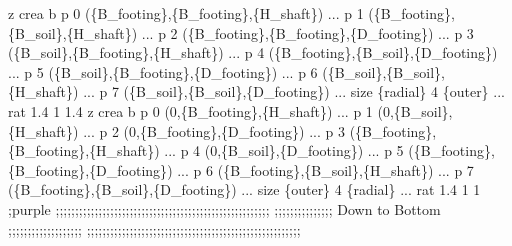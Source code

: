 \documentclass[a4paper, nobind]{templates/ociamthesis}
\newenvironment{Shaded}{\begin{snugshade}}{\end{snugshade}}
\newcommand{\SpecialCharTok}[1]{\textcolor[rgb]{0.00,0.00,0.00}{#1}}
\newcommand{\StringTok}[1]{\textcolor[rgb]{0.31,0.60,0.02}{#1}}
\renewenvironment{Shaded}
{
  \vspace{10pt}%
  \begin{snugshade}%
}{%
  \end{snugshade}%
  \vspace{8pt}%
}
\begin{document}
\begin{Shaded}
\begin{Highlighting}[]
\StringTok{z crea b p 0 (}\SpecialCharTok{\{B\_footing\}}\StringTok{,}\SpecialCharTok{\{B\_footing\}}\StringTok{,}\SpecialCharTok{\{H\_shaft\}}\StringTok{) ...}
\StringTok{         p 1 (}\SpecialCharTok{\{B\_footing\}}\StringTok{,}\SpecialCharTok{\{B\_soil\}}\StringTok{,}\SpecialCharTok{\{H\_shaft\}}\StringTok{) ...}
\StringTok{         p 2 (}\SpecialCharTok{\{B\_footing\}}\StringTok{,}\SpecialCharTok{\{B\_footing\}}\StringTok{,}\SpecialCharTok{\{D\_footing\}}\StringTok{) ...}
\StringTok{         p 3 (}\SpecialCharTok{\{B\_soil\}}\StringTok{,}\SpecialCharTok{\{B\_footing\}}\StringTok{,}\SpecialCharTok{\{H\_shaft\}}\StringTok{) ...}
\StringTok{         p 4 (}\SpecialCharTok{\{B\_footing\}}\StringTok{,}\SpecialCharTok{\{B\_soil\}}\StringTok{,}\SpecialCharTok{\{D\_footing\}}\StringTok{) ...}
\StringTok{         p 5 (}\SpecialCharTok{\{B\_soil\}}\StringTok{,}\SpecialCharTok{\{B\_footing\}}\StringTok{,}\SpecialCharTok{\{D\_footing\}}\StringTok{) ...}
\StringTok{         p 6 (}\SpecialCharTok{\{B\_soil\}}\StringTok{,}\SpecialCharTok{\{B\_soil\}}\StringTok{,}\SpecialCharTok{\{H\_shaft\}}\StringTok{) ...}
\StringTok{         p 7 (}\SpecialCharTok{\{B\_soil\}}\StringTok{,}\SpecialCharTok{\{B\_soil\}}\StringTok{,}\SpecialCharTok{\{D\_footing\}}\StringTok{) ...}
\StringTok{         size }\SpecialCharTok{\{radial\}}\StringTok{ 4 }\SpecialCharTok{\{outer\}}\StringTok{ ...}
\StringTok{         rat 1.4 1 1.4}
\StringTok{           }
\StringTok{z crea b p 0 (0,}\SpecialCharTok{\{B\_footing\}}\StringTok{,}\SpecialCharTok{\{H\_shaft\}}\StringTok{) ...}
\StringTok{         p 1 (0,}\SpecialCharTok{\{B\_soil\}}\StringTok{,}\SpecialCharTok{\{H\_shaft\}}\StringTok{) ...}
\StringTok{         p 2 (0,}\SpecialCharTok{\{B\_footing\}}\StringTok{,}\SpecialCharTok{\{D\_footing\}}\StringTok{) ...}
\StringTok{         p 3 (}\SpecialCharTok{\{B\_footing\}}\StringTok{,}\SpecialCharTok{\{B\_footing\}}\StringTok{,}\SpecialCharTok{\{H\_shaft\}}\StringTok{) ...}
\StringTok{         p 4 (0,}\SpecialCharTok{\{B\_soil\}}\StringTok{,}\SpecialCharTok{\{D\_footing\}}\StringTok{) ...}
\StringTok{         p 5 (}\SpecialCharTok{\{B\_footing\}}\StringTok{,}\SpecialCharTok{\{B\_footing\}}\StringTok{,}\SpecialCharTok{\{D\_footing\}}\StringTok{) ...}
\StringTok{         p 6 (}\SpecialCharTok{\{B\_footing\}}\StringTok{,}\SpecialCharTok{\{B\_soil\}}\StringTok{,}\SpecialCharTok{\{H\_shaft\}}\StringTok{) ...}
\StringTok{         p 7 (}\SpecialCharTok{\{B\_footing\}}\StringTok{,}\SpecialCharTok{\{B\_soil\}}\StringTok{,}\SpecialCharTok{\{D\_footing\}}\StringTok{) ...}
\StringTok{         size }\SpecialCharTok{\{outer\}}\StringTok{ 4 }\SpecialCharTok{\{radial\}}\StringTok{ ...}
\StringTok{         rat 1.4 1 1 ;purple}
\StringTok{         }
\StringTok{         }
\StringTok{         }
\StringTok{;;;;;;;;;;;;;;;;;;;;;;;;;;;;;;;;;;;;;;;;;;;;;;;;;;;;;;;}
\StringTok{;;;;;;;;;;;;;;;   Down to Bottom    ;;;;;;;;;;;;;;;;;;;}
\StringTok{;;;;;;;;;;;;;;;;;;;;;;;;;;;;;;;;;;;;;;;;;;;;;;;;;;;;;;;}


\end{Highlighting}
\end{Shaded}
\end{document}
